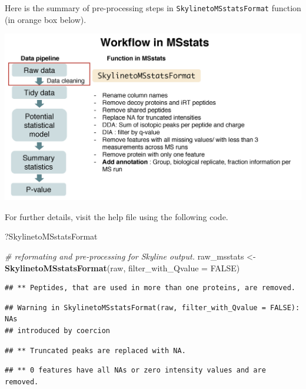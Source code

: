 \documentclass[]{book}
\newenvironment{Shaded}{\begin{snugshade}}{\end{snugshade}}
\newcommand{\CommentTok}[1]{\textcolor[rgb]{0.56,0.35,0.01}{\textit{#1}}}
\newcommand{\DataTypeTok}[1]{\textcolor[rgb]{0.13,0.29,0.53}{#1}}
\newcommand{\KeywordTok}[1]{\textcolor[rgb]{0.13,0.29,0.53}{\textbf{#1}}}
\newcommand{\NormalTok}[1]{#1}
\newcommand{\OtherTok}[1]{\textcolor[rgb]{0.56,0.35,0.01}{#1}}
\newcommand{\StringTok}[1]{\textcolor[rgb]{0.31,0.60,0.02}{#1}}
\begin{document}
Here is the summary of pre-processing steps in \texttt{SkylinetoMSstatsFormat} function (in orange box below).

\includegraphics{img/MSstats_Skyline.png}

For further details, visit the help file using the following code.

\begin{Shaded}
\begin{Highlighting}[]
\NormalTok{?SkylinetoMSstatsFormat}
\end{Highlighting}
\end{Shaded}

\begin{Shaded}
\begin{Highlighting}[]
\CommentTok{# reformating and pre-processing for Skyline output.}
\NormalTok{raw_msstats <-}\StringTok{ }\KeywordTok{SkylinetoMSstatsFormat}\NormalTok{(raw, }\DataTypeTok{filter_with_Qvalue =} \OtherTok{FALSE}\NormalTok{)}
\end{Highlighting}
\end{Shaded}

\begin{verbatim}
## ** Peptides, that are used in more than one proteins, are removed.
\end{verbatim}

\begin{verbatim}
## Warning in SkylinetoMSstatsFormat(raw, filter_with_Qvalue = FALSE): NAs
## introduced by coercion
\end{verbatim}

\begin{verbatim}
## ** Truncated peaks are replaced with NA.
\end{verbatim}

\begin{verbatim}
## ** 0 features have all NAs or zero intensity values and are removed.
\end{verbatim}
\end{document}
